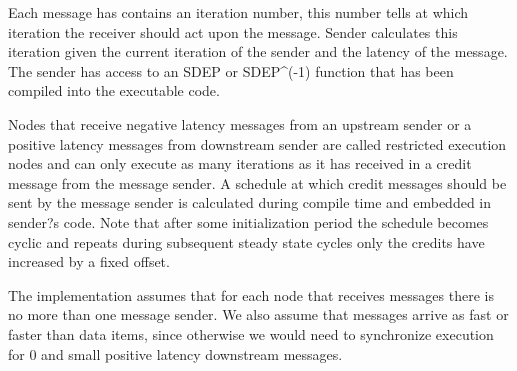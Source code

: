 Each message has contains an iteration number, this number tells at which
iteration the receiver should act upon the message. Sender calculates this
iteration given the current iteration of the sender and the latency of the
message. The sender has access to an SDEP or SDEP^(-1) function that has been
compiled into the executable code.
                                                                                                     
Nodes that receive negative latency messages from an upstream sender or a
positive latency messages from downstream sender are called restricted
execution nodes and can only execute as many iterations as it has received in a
credit message from the message sender. A schedule at which credit messages
should be sent by the message sender is calculated during compile time and
embedded in sender?s code. Note that after some initialization period the
schedule becomes cyclic and repeats during subsequent steady state cycles only
the credits have increased by a fixed offset.
                                                                                                     
The implementation assumes that for each node that receives messages there is no
more than one message sender. We also assume that messages arrive as fast or
faster than data items, since otherwise we would need to synchronize execution
for 0 and small positive latency downstream messages.
                                                                                                     
